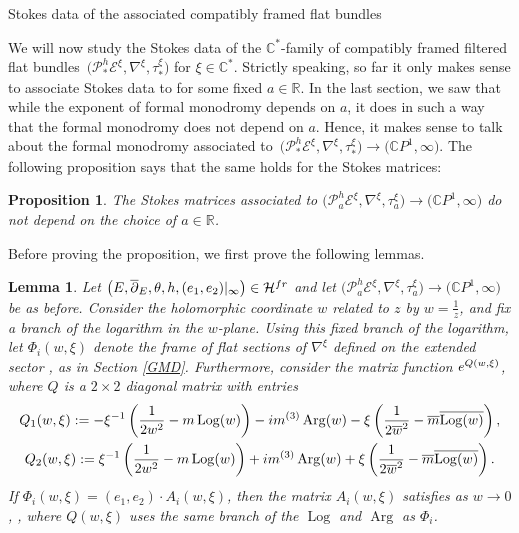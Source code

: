\documentclass[11pt]{article}
\numberwithin{equation}{section}
\newtheorem{Lemma}[Theorem]{Lemma}
\newtheorem{Proposition}[Theorem]{Proposition}
 { \theoremstyle{definition}
\newtheorem{Definition}[Theorem]{Definition}
\newtheorem{Notation}[Theorem]{Notation}
\newtheorem{Example}[Theorem]{Example}
\newtheorem{Remark}[Theorem]{Remark} }
\numberwithin{equation}{section}
\newcommand{\CP}{\mathbb{C}P^1}
\begin{document}
\begin{subsubsection}{Stokes data of the associated compatibly framed flat bundles}

We will now study the Stokes data of the $\mathbb{C}^*$-family of compatibly framed filtered flat bundles~${\bigl(\mathcal{P}^h_*\mathcal{E}^{\xi},\nabla^{\xi}, \tau_{*}^{\xi}\bigr)}$ for $\xi \in \mathbb{C}^*$. Strictly speaking, so far it only makes sense to associate Stokes data to  for some fixed $a\in \mathbb{R}$. In the last section, we saw that while the exponent of formal monodromy depends on $a$, it does in such a way that the formal monodromy does not depend on $a$. Hence, it makes sense to talk about the formal monodromy associated to~${\bigl(\mathcal{P}^h_*\mathcal{E}^{\xi},\nabla^{\xi}, \tau_{*}^{\xi}\bigr)\to \bigl(\CP,\infty\bigr)}$. The following proposition says that the same holds for the Stokes matrices:

\begin{Proposition}\label{SM} The Stokes matrices associated to $\bigl(\mathcal{P}^h_a\mathcal{E}^{\xi},\nabla^{\xi}, \tau_{a}^{\xi}\bigr)\to \bigl(\CP,\infty\bigr)$ do not depend on the choice of $a\in \mathbb{R}$.
\end{Proposition}

Before proving the proposition, we first prove the following lemmas.
\begin{Lemma}\label{twistasymp}
 Let $\bigl(E,\overline{\partial}_E,\theta,h,(e_1,e_2)|_{\infty}\bigr)\in \mathcal{H}^{{\rm fr}}$ and let $\bigl(\mathcal{P}^h_a\mathcal{E}^{\xi},\nabla^{\xi}, \tau_{a}^{\xi}\bigr)\to \bigl(\CP,\infty\bigr)$ be as before. Consider the holomorphic coordinate $w$ related to $z$ by $w=\frac{1}{z}$, and fix a branch of the logarithm in the $w$-plane. Using this fixed branch of the logarithm, let $\Phi_i(w,\xi)$ denote the frame of flat sections of $\nabla^{\xi}$ defined on the extended sector , as in Section {\rm\ref{GMD}}. Furthermore, consider the matrix function ${\rm e}^{Q(w,\xi)}$, where $Q$ is a $2\times 2$ diagonal matrix with entries
\begin{gather*}
 Q_1(w,\xi):= -\xi^{-1}\left(\frac{1}{2w^2}-m\operatorname{Log}(w)\right)-{\rm i}m^{(3)}\operatorname{Arg}(w)-\xi\left(\frac{1}{2\overline{w}^2}-\overline{m}\overline{\operatorname{Log}(w)}\right),\\
 Q_2(w,\xi):=\xi^{-1}\left(\frac{1}{2w^2}-m\operatorname{Log}(w)\right)+{\rm i}m^{(3)}\operatorname{Arg}(w)+\xi\left(\frac{1}{2\overline{w}^2}
 -\overline{m}\overline{\operatorname{Log}(w)}\right).
\end{gather*}
 If $\Phi_i(w,\xi)=(e_1,e_2)\cdot A_i(w,\xi)$, then the matrix $A_i(w,\xi)$ satisfies
 as $ w\to 0$, ,
where $Q(w,\xi)$ uses the same branch of the $\operatorname{Log}$ and $\operatorname{Arg}$ as $\Phi_i$.
\end{Lemma}


\end{subsubsection}
\end{document}
